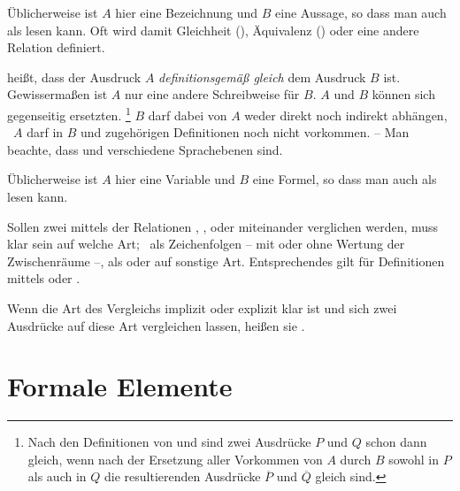 \begin{description}
	Üblicherweise ist $A$ hier eine Bezeichnung und $B$ eine Aussage, so dass man  auch als  lesen kann.
	Oft wird damit Gleichheit (\opqt{=}), Äquivalenz (\opqt{\equiv}) oder eine andere Relation definiert.
	\item[\opqt{\glsSym{defeq}}~\emph{\Idx{Definition}}]
	 heißt, dass der Ausdruck $A$ \emph{definitionsgemäß gleich} dem Ausdruck $B$ ist.
	Gewissermaßen ist $A$ nur eine andere Schreibweise für $B$.
	$A$ und $B$ können sich gegenseitig ersetzten.%
	\footnote{%
		Nach den Definitionen von \opqt{\metadefeq} und  sind zwei Ausdrücke $P$ und $Q$ schon dann gleich, wenn nach der Ersetzung aller Vorkommen von $A$ durch $B$ sowohl in $P$ als auch in $Q$ die resultierenden Ausdrücke $\overline{P}$ und $\overline{Q}$ gleich sind.%
	}
	$B$ darf dabei von $A$ weder direkt noch indirekt abhängen, \textdh\ $A$ darf in $B$ und zugehörigen Definitionen noch nicht vorkommen.
	-- Man beachte, dass \opqt{\metadefeq} und  verschiedene Sprachebenen sind.

	Üblicherweise ist $A$ hier eine Variable und $B$ eine Formel, so dass man  auch als  lesen kann.
\end{description}
%

Sollen zwei  mittels der Relationen \opqt{=}, \opqt{\ne}, \opqt{\equiv} oder \opqt{\nequiv} miteinander verglichen werden, muss klar sein auf welche Art; \textzB\ als Zeichenfolgen -- mit oder ohne Wertung der Zwischenräume --, als  oder auf sonstige Art.
Entsprechendes gilt für Definitionen mittels \opqt{\metadefeq} oder .

Wenn die Art des Vergleichs implizit oder explizit klar ist und sich zwei Ausdrücke auf diese Art vergleichen lassen, heißen sie \emph{}.

\endgroup%

\section{Formale Elemente}%
\label{sec:Formalelement}

